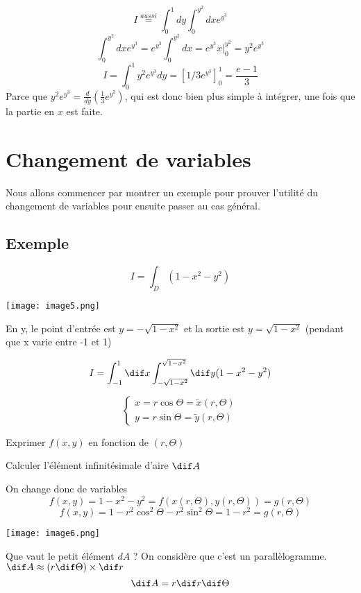 \[I \overset{aussi}{=}\int_0^1dy \int_0^{y^2} dx e^{y^3}\]
\[\int_0^{y^2} dx e^{y^3} = e^{y^3} \int_0^{y^2} dx = e^{y^3} x \Big|_0^{y^2} = y^2 e^{y^3}\]
\[I=\int_0^1 y^2 e^{y^3} dy = \left[1/3 e ^{y^3}\right]_0^1  = \frac{e-1}{3}\]
Parce que $y^2 e^{y^3} = \frac{d}{dy}(\frac{1}{3} e^{y^3})$,
qui est donc bien plus simple à intégrer, une fois que la partie en $x$ est faite.

\section{Changement de variables}
Nous allons commencer par montrer un exemple pour prouver l'utilité du changement de variables pour ensuite passer au cas général.
\subsection{Exemple}
\[I=\int_D (1-x^2-y^2)\]
\begin{center}
\texttt{[image: image5.png]}
\end{center}

En y, le point d'entrée est $y=-\sqrt{1-x^2}$ et la sortie est  $y=\sqrt{1-x^2}$ (pendant que x varie entre -1 et 1)

\[I=\int_{-1}^1 \dif x \int_{-\sqrt{1-x^2}}^{\sqrt{1-x^2}} \dif y(1-x^2-y^2) \]

\begin{myrem}
$$\left\{
\begin{array}{r}
x=r\cos\Theta = \tilde{x}(r,\Theta)\\
y=r \sin \Theta = \tilde{y}(r,\Theta)
\end{array}
\right.
$$

Exprimer $f(x,y)$ en fonction de $(r,\Theta)$

Calculer l'élément infinitésimale d'aire $\dif A$
\end{myrem}

On change donc de variables
\[f(x,y)=1-x^2-y^2=f(x(r,\Theta),y(r,\Theta)) = g(r,\Theta)\]
\[f(x,y) = 1-r^2\cos^2\Theta -r^2\sin^2\Theta = 1-r^2 = g(r,\Theta)\]
\begin{center}

\texttt{[image: image6.png]}\\

\end{center}
Que vaut le petit élément $dA$ ? On considère que c'est un parallèlogramme.
$\dif A\approx (r\dif\Theta)\times \dif r$
\[\dif A = r \dif r \dif\Theta\]

